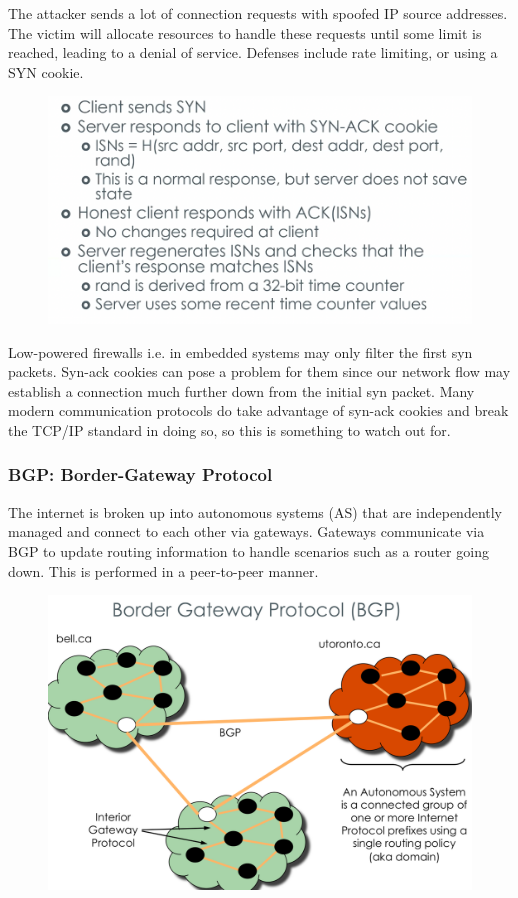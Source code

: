\documentclass[../notes.tex]{subfiles}
\begin{document}
The attacker sends a lot of connection requests with spoofed IP source addresses. The victim will allocate resources to handle these requests until some limit is reached, leading to a denial of service.
Defenses include rate limiting, or using a SYN cookie.

\begin{figure}[H]
    \centering
    \includegraphics[width=0.8\linewidth]{img/image_2023-03-28-17-02-16.png}
\end{figure}


Low-powered firewalls i.e. in embedded systems may only filter the first syn packets. Syn-ack cookies can pose a problem for them since our network flow may establish a connection much further down from the initial syn packet. Many modern communication protocols do take advantage of syn-ack cookies and break the TCP/IP standard in doing so, so this is something to watch out for.



\subsubsection{BGP: Border-Gateway Protocol}

The internet is broken up into autonomous systems (AS) that are independently managed and connect to each other via gateways. 
Gateways communicate via BGP to update routing information to handle scenarios such as a router going down. This is performed in a peer-to-peer manner.

\begin{figure}[H]
    \centering
    \includegraphics[width=0.8\linewidth]{img/image_2023-03-29-14-57-31.png}
\end{figure}
\end{document}
